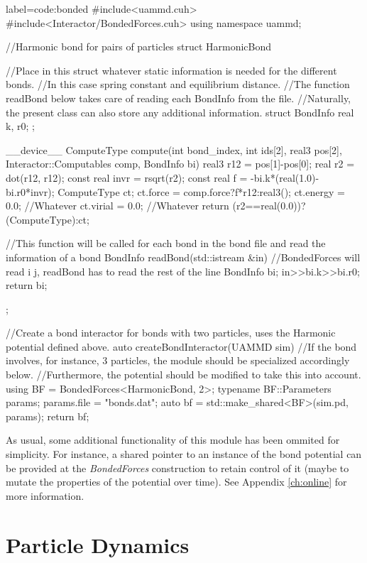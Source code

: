 \documentclass[ twoside,openright,titlepage,numbers=noenddot,%
headinclude,footinclude,cleardoublepage=empty,abstract=on,
BCOR=5mm,paper=a4,fontsize=11pt, dvipsnames
]{scrreprt}
\begin{document}
\begin{code2} {label=code:bonded}
#include<uammd.cuh>
#include<Interactor/BondedForces.cuh>
using namespace uammd;

//Harmonic bond for pairs of particles
struct HarmonicBond{
  //Place in this struct whatever static information is needed for the different bonds.
  //In this case spring constant and equilibrium distance.
  //The function readBond below takes care of reading each BondInfo from the file.
  //Naturally, the present class can also store any additional information.
  struct BondInfo{
    real k, r0;
  };

  __device__ ComputeType compute(int bond_index,
                        int ids[2], real3 pos[2],
                        Interactor::Computables comp,
                        BondInfo bi){
    real3 r12 = pos[1]-pos[0];
    real r2 = dot(r12, r12);
    const real invr = rsqrt(r2);
    const real f = -bi.k*(real(1.0)-bi.r0*invr);
    ComputeType ct;
    ct.force = comp.force?f*r12:real3();
    ct.energy = 0.0; //Whatever
    ct.virial = 0.0; //Whatever
    return (r2==real(0.0))?(ComputeType{}):ct;
  }

  //This function will be called for each bond in the bond file and read the information of a bond
  BondInfo readBond(std::istream &in){
    //BondedForces will read i j, readBond has to read the rest of the line
    BondInfo bi;
    in>>bi.k>>bi.r0;
    return bi;
  }
};

//Create a bond interactor for bonds with two particles, uses the Harmonic potential defined above.
auto createBondInteractor(UAMMD sim){
  //If the bond involves, for instance, 3 particles, the module should be specialized accordingly below.
  //Furthermore, the potential should be modified to take this into account.
  using BF = BondedForces<HarmonicBond, 2>;
  typename BF::Parameters params;
  params.file = "bonds.dat";
  auto bf = std::make_shared<BF>(sim.pd, params);
  return bf;
}

\end{code2}

As usual, some additional functionality of this module has been ommited for simplicity. For instance, a shared pointer to an instance of the bond potential can be provided at the \emph{BondedForces} construction to retain control of it (maybe to mutate the properties of the potential over time). See Appendix \ref{ch:online} for more information.

\chapter{Particle Dynamics}\label{sec:dynamics}
\end{document}
